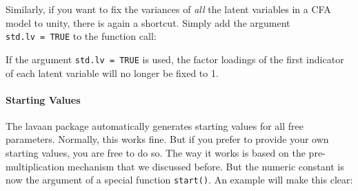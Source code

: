 \begin{Shaded}
\begin{Highlighting}[]
\OtherTok{\textless{}{-}} 

\OtherTok{\textless{}{-}} 
                     \NormalTok{)}
\end{Highlighting}
\end{Shaded}

Similarly, if you want to fix the variances of \emph{all} the latent
variables in a CFA model to unity, there is again a shortcut. Simply add
the argument \texttt{std.lv\ =\ TRUE} to the function call:

\begin{Shaded}
\begin{Highlighting}[]
\OtherTok{\textless{}{-}} 

\OtherTok{\textless{}{-}} 
            \NormalTok{)}
\end{Highlighting}
\end{Shaded}

If the argument \texttt{std.lv\ =\ TRUE} is used, the factor loadings of
the first indicator of each latent variable will no longer be fixed to
1.

\hypertarget{starting-values}{%
\paragraph{Starting Values}\label{starting-values}}

The lavaan package automatically generates starting values for all free
parameters. Normally, this works fine. But if you prefer to provide your
own starting values, you are free to do so. The way it works is based on
the pre-multiplication mechanism that we discussed before. But the
numeric constant is now the argument of a special function
\texttt{start()}. An example will make this clear:

